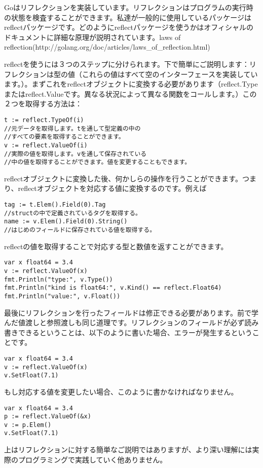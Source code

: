 Goはリフレクションを実装しています。リフレクションはプログラムの実行時の状態を検査することができます。私達が一般的に使用しているパッケージはreflectパッケージです。どのようにreflectパッケージを使うかはオフィシャルのドキュメントに詳細な原理が説明されています。laws of reflection(http:\//\//golang.org\//doc\//articles\//laws\_of\_reflection.html)

reflectを使うには３つのステップに分けられます。下で簡単にご説明します：リフレクションは型の値（これらの値はすべて空のインターフェースを実装しています。）。まずこれをreflectオブジェクトに変換する必要があります（reflect.Typeまたはreflect.Valueです。異なる状況によって異なる関数をコールします。）この２つを取得する方法は：

\begin{lstlisting}[numbers=none]
t := reflect.TypeOf(i)
//元データを取得します。tを通して型定義の中の
//すべての要素を取得することができます。
v := reflect.ValueOf(i)
//実際の値を取得します。vを通して保存されている
//中の値を取得することができます。値を変更することもできます。
\end{lstlisting}

reflectオブジェクトに変換した後、何かしらの操作を行うことができます。つまり、reflectオブジェクトを対応する値に変換するのです。例えば

\begin{lstlisting}[numbers=none]
tag := t.Elem().Field(0).Tag
//structの中で定義されているタグを取得する。
name := v.Elem().Field(0).String()
//はじめのフィールドに保存されている値を取得する。
\end{lstlisting}

reflectの値を取得することで対応する型と数値を返すことができます。

\begin{lstlisting}[numbers=none]
var x float64 = 3.4
v := reflect.ValueOf(x)
fmt.Println("type:", v.Type())
fmt.Println("kind is float64:", v.Kind() == reflect.Float64)
fmt.Println("value:", v.Float())
\end{lstlisting}

最後にリフレクションを行ったフィールドは修正できる必要があります。前で学んだ値渡しと参照渡しも同じ道理です。リフレクションのフィールドが必ず読み書きできるということは、以下のように書いた場合、エラーが発生するということです。



\begin{lstlisting}[numbers=none]
var x float64 = 3.4
v := reflect.ValueOf(x)
v.SetFloat(7.1)
\end{lstlisting}

もし対応する値を変更したい場合、このように書かなければなりません。

\begin{lstlisting}[numbers=none]
var x float64 = 3.4
p := reflect.ValueOf(&x)
v := p.Elem()
v.SetFloat(7.1)
\end{lstlisting}

上はリフレクションに対する簡単なご説明ではありますが、より深い理解には実際のプログラミングで実践していく他ありません。
